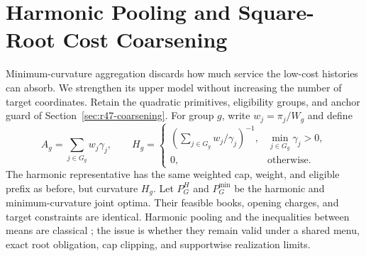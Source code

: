 \section{Harmonic Pooling and Square-Root Cost Coarsening}\label{sec:r48-harmonic}
Minimum-curvature aggregation discards how much service the low-cost histories can absorb. We strengthen its upper model without increasing the number of target coordinates. Retain the quadratic primitives, eligibility groups, and anchor guard of Section~\ref{sec:r47-coarsening}. For group $g$, write $w_j=\pi_j/W_g$ and define
\begin{equation}\label{eq:r48-curvature}
 A_g=\sum_{j\in G_g}w_j\gamma_j,\qquad
 H_g=\begin{cases}(\sum_{j\in G_g}w_j/\gamma_j)^{-1},&\min_{j\in G_g}\gamma_j>0,\\0,&\text{otherwise}.\end{cases}
\end{equation}
The harmonic representative has the same weighted cap, weight, and eligible prefix as before, but curvature $H_g$. Let $P_G^H$ and $P_G^{\min}$ be the harmonic and minimum-curvature joint optima. Their feasible books, opening charges, and target constraints are identical. Harmonic pooling and the inequalities between means are classical \citep{LiaoWu2015}; the issue is whether they remain valid under a shared menu, exact root obligation, cap clipping, and supportwise realization limits.

